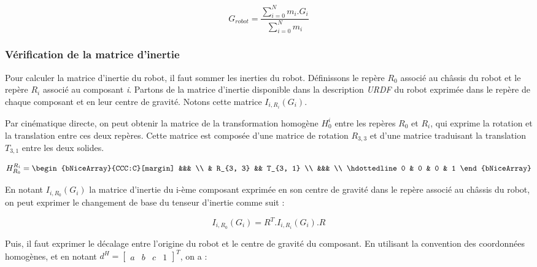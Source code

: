 				\begin{equation}
					G_{robot} = \frac{\sum_{i=0}^{N}m_i.G_i}{\sum_{i=0}^{N}m_i}
				\end{equation}

			\subsubsection{Vérification de la matrice d'inertie}

				Pour calculer la matrice d'inertie du robot, il faut sommer les inerties du robot. Définissons le repère $R_0$ associé au châssis du robot et le repère $R_i$ associé au composant \textit{i}. Partons de la matrice d'inertie disponible dans la description \textit{URDF} du robot exprimée dans le repère de chaque composant et en leur centre de gravité. Notons cette matrice $I_{i, R_i}(G_i)$. 
				
				Par cinématique directe, on peut obtenir la matrice de la transformation homogène $H_0^i$ entre les repères $R_0$ et $R_i$, qui exprime la rotation et la translation entre ces deux repères. Cette matrice est composée d'une matrice de rotation $R_{3, 3}$ et d'une matrice traduisant la translation $T_{3, 1}$ entre les deux solides.

				\begin{equation}
					H_{R_0}^{R_i} = \begin{bNiceArray}{CCC:C}[margin] &&& \\ & R_{3, 3} && T_{3, 1} \\ &&& \\ \hdottedline 0 & 0 & 0 & 1 \end{bNiceArray}
				\end{equation}

				En notant $I_{i, R_0}(G_i)$ la matrice d'inertie du i-ème composant exprimée en son centre de gravité dans le repère associé au châssis du robot, on peut exprimer le changement de base du tenseur d'inertie comme suit :

				\begin{equation}
					I_{i, R_0}(G_i) = R^T.I_{i, R_i}(G_i).R
				\end{equation}

				Puis, il faut exprimer le décalage entre l'origine du robot et le centre de gravité du composant. En utilisant la convention des coordonnées homogènes, et en notant $d^H = \begin{bmatrix}a & b & c & 1\end{bmatrix}^T$, on a :

